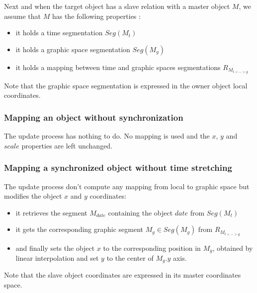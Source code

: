 \documentclass[a4paper]{article}
\newcommand{\seg}[1]		{Seg(#1)}
\begin{document}

Next and when the target object has a slave relation with a master object $M$, we assume that $M$ has the following properties :
\vspace{-2mm}
\begin{itemize}
\item it holds a time segmentation $\seg{M_{t}}$
\item it holds a graphic space segmentation $\seg{M_{g}}$
\item it holds a mapping between time and graphic spaces segmentations $R_{M_{t<->g}}$
\end{itemize}
Note that the graphic space segmentation is expressed in the owner object local coordinates.

\subsubsection{Mapping an object without synchronization}
The update process has nothing to do. No mapping is used and the $x$, $y$ and $scale$ properties are left unchanged.

\subsubsection{Mapping a synchronized object without time stretching}
The update process don't compute any mapping from local to graphic space but modifies the object $x$ and $y$ coordinates:
\vspace{-2mm}
\begin{itemize}
\item it retrieves the segment $M_{date}$ containing the object $date$ from $\seg{M_{t}}$
\item it gets the corresponding graphic segment $M_{g} \in \seg{M_{g}}$ from $R_{M_{t<->g}}$
\item and finally sets the object $x$ to the corresponding position in $M_{g}$, obtained by linear interpolation and set $y$ to the center of $M_{g}.y$ axis.
\end{itemize}
Note that the slave object coordinates are expressed in its master coordinates space.
\end{document}
